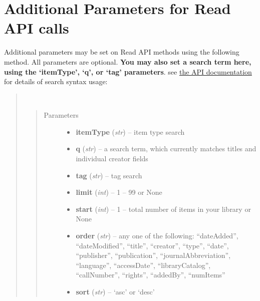 \documentclass[letterpaper,10pt,english]{sphinxmanual}
\begin{document}
\section{Additional Parameters for Read API calls}
\label{index:additional-parameters-for-read-api-calls}
Additional parameters may be set on Read API methods using the following method. All parameters are optional. \textbf{You may also set a search term here, using the `itemType', `q', or `tag' parameters}. see \href{http://www.zotero.org/support/dev/server\_api/read\_api\#search\_syntax}{the API documentation} for details of search syntax usage:
\begin{quote}

\begin{fulllineitems}
\label{index:pyzotero.zotero.Zotero.add_parameters}~\begin{quote}\begin{description}
\item[{Parameters}] \leavevmode\begin{itemize}
\item {} 
\textbf{itemType} (\emph{str}) -- item type search

\item {} 
\textbf{q} (\emph{str}) -- a search term, which currently matches titles and individual creator fields

\item {} 
\textbf{tag} (\emph{str}) -- tag search

\item {} 
\textbf{limit} (\emph{int}) -- 1 – 99 or None

\item {} 
\textbf{start} (\emph{int}) -- 1 – total number of items in your library or None

\item {} 
\textbf{order} (\emph{str}) -- any one of the following: “dateAdded”, “dateModified”, “title”, “creator”, “type”, “date”, “publisher”, “publication”, “journalAbbreviation”, “language”, “accessDate”, “libraryCatalog”, “callNumber”, “rights”, “addedBy”, “numItems”

\item {} 
\textbf{sort} (\emph{str}) -- `asc' or `desc'


\end{itemize}
\end{description}
\end{quote}
\end{fulllineitems}
\end{quote}
\end{document}
